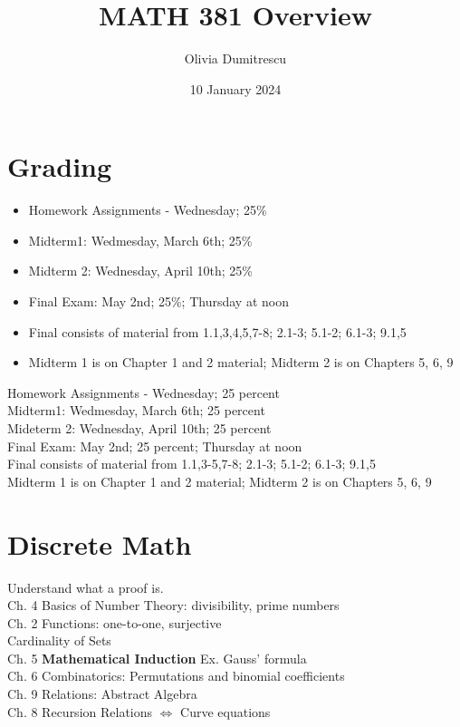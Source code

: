 \documentclass[a4paper, 12pt]{article}
\title{MATH 381 Overview}
\author{Olivia Dumitrescu}
\date{10 January 2024}
\newcommand{\keyword}[1]{\textbf{#1}}
\begin{document}
    \maketitle
    \section*{Grading}
    \begin{itemize}
        \item Homework Assignments - Wednesday; 25\%
        \item Midterm1: Wedmesday, March 6th; 25\%
        \item Midterm 2: Wednesday, April 10th; 25\%
        \item Final Exam: May 2nd; 25\%; Thursday at noon
        \item Final consists of material from 1.1,3,4,5,7-8;
        2.1-3; 5.1-2; 6.1-3; 9.1,5
        \item Midterm 1 is on Chapter 1 and 2 material;
        Midterm 2 is on Chapters 5, 6, 9
    \end{itemize}
    Homework Assignments - Wednesday; 25 percent\\
    Midterm1: Wedmesday, March 6th; 25 percent\\
    Mideterm 2: Wednesday, April 10th; 25 percent\\
    Final Exam: May 2nd; 25 percent; Thursday at noon\\
    Final consists of material from 1.1,3-5,7-8; 2.1-3; 5.1-2; 6.1-3; 9.1,5\\
    Midterm 1 is on Chapter 1 and 2 material; Midterm 2 is on Chapters 5, 6, 9\\
    \section*{Discrete Math}
    Understand what a proof is.\\
    Ch. 4 Basics of Number Theory: divisibility, prime numbers\\
    Ch. 2 Functions: one-to-one, surjective\\
    Cardinality of Sets\\
    Ch. 5 \keyword{Mathematical Induction} Ex. Gauss' formula\\
    Ch. 6 Combinatorics: Permutations and binomial coefficients\\
    Ch. 9 Relations: Abstract Algebra\\
    Ch. 8 Recursion Relations $\iff$ Curve equations
\end{document}
